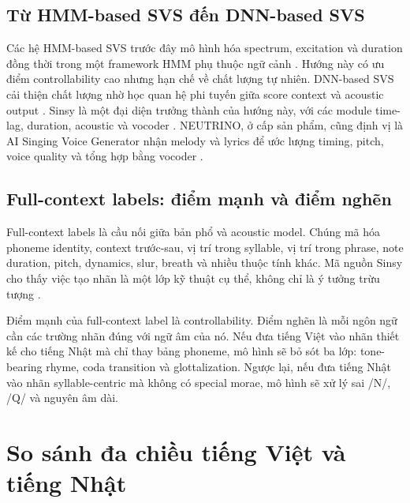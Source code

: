 \documentclass[12pt,a4paper]{article}
\begin{document}
\subsection{Từ HMM-based SVS đến DNN-based SVS}

Các hệ HMM-based SVS trước đây mô hình hóa spectrum, excitation và duration đồng thời trong một framework HMM phụ thuộc ngữ cảnh \parencite{saino2006hmm}. Hướng này có ưu điểm controllability cao nhưng hạn chế về chất lượng tự nhiên. DNN-based SVS cải thiện chất lượng nhờ học quan hệ phi tuyến giữa score context và acoustic output \parencite{nishimura2016dnnSVS}. Sinsy là một đại diện trưởng thành của hướng này, với các module time-lag, duration, acoustic và vocoder \parencite{hono2021sinsy}. NEUTRINO, ở cấp sản phẩm, cũng định vị là AI Singing Voice Generator nhận melody và lyrics để ước lượng timing, pitch, voice quality và tổng hợp bằng vocoder \parencite{neutrinoOfficial}.

\subsection{Full-context labels: điểm mạnh và điểm nghẽn}

Full-context labels là cầu nối giữa bản phổ và acoustic model. Chúng mã hóa phoneme identity, context trước-sau, vị trí trong syllable, vị trí trong phrase, note duration, pitch, dynamics, slur, breath và nhiều thuộc tính khác. Mã nguồn Sinsy cho thấy việc tạo nhãn là một lớp kỹ thuật cụ thể, không chỉ là ý tưởng trừu tượng \parencite{sinsyGithub}.

Điểm mạnh của full-context label là controllability. Điểm nghẽn là mỗi ngôn ngữ cần các trường nhãn đúng với ngữ âm của nó. Nếu đưa tiếng Việt vào nhãn thiết kế cho tiếng Nhật mà chỉ thay bảng phoneme, mô hình sẽ bỏ sót ba lớp: tone-bearing rhyme, coda transition và glottalization. Ngược lại, nếu đưa tiếng Nhật vào nhãn syllable-centric mà không có special morae, mô hình sẽ xử lý sai /N/, /Q/ và nguyên âm dài.

\section{So sánh đa chiều tiếng Việt và tiếng Nhật}
\end{document}
